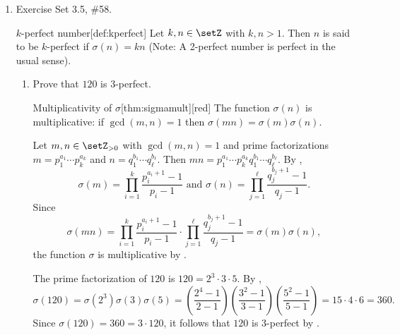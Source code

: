 \begin{enumerate}
  \item Exercise Set 3.5, \#58.
  \begin{define}{$k$-perfect number}[def:kperfect]
  Let $k, n \in \setZ$ with $k, n>1$. Then $n$ is said to be $k$-perfect if $\sigma(n)=k n$ (Note: A 2-perfect number is perfect in the usual sense).
  \end{define}
  \begin{enumerate}
    \item Prove that $120$ is $3$-perfect.
    \begin{define}{Multiplicativity of $\sigma$}[thm:sigmamult][red]
    The function $\sigma(n)$ is multiplicative: if $\gcd(m,n)=1$ then $\sigma(mn)=\sigma(m)\sigma(n)$.
    \begin{subprove}
      Let $m,n \in \setZ_{>0}$ with $\gcd(m,n)=1$ and prime factorizations 
      $m = p_1^{a_1} \cdots p_k^{a_k}$ and $n = q_1^{b_1} \cdots q_\ell^{b_\ell}$.
      Then $mn = p_1^{a_1} \cdots p_k^{a_k} q_1^{b_1} \cdots q_\ell^{b_\ell}$.
      By , 
      \[
      \sigma(m) = \prod_{i=1}^k \frac{p_i^{a_i+1}-1}{p_i-1} \text{ and } \sigma(n) = \prod_{j=1}^\ell \frac{q_j^{b_j+1}-1}{q_j-1}.
      \]
      Since 
      \[
      \sigma(mn) = \prod_{i=1}^k \frac{p_i^{a_i+1}-1}{p_i-1} \cdot \prod_{j=1}^\ell \frac{q_j^{b_j+1}-1}{q_j-1} = \sigma(m)\sigma(n),
      \]
      the function $\sigma$ is multiplicative by .
    \end{subprove}
    \end{define}
    \begin{subprove}
      The prime factorization of $120$ is $120 = 2^3 \cdot 3 \cdot 5$. 
      By , 
      \[
      \sigma(120) = \sigma(2^3)\sigma(3)\sigma(5) = \left(\frac{2^4-1}{2-1}\right) \left(\frac{3^2-1}{3-1}\right) \left(\frac{5^2-1}{5-1}\right) = 15 \cdot 4 \cdot 6 = 360.
      \]
      Since $\sigma(120) = 360 = 3 \cdot 120$, it follows that $120$ is $3$-perfect by .
    \end{subprove}


\end{enumerate}
\end{enumerate}

